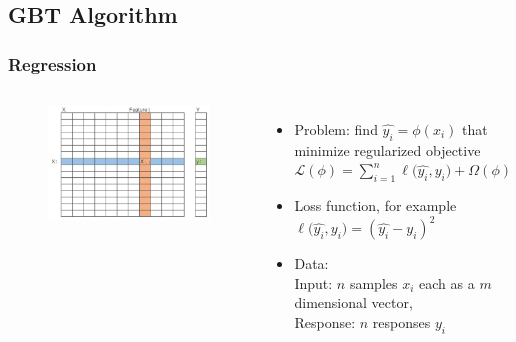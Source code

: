 \documentclass{beamer}
\begin{document}
\subsection{GBT Algorithm} 
\begin{frame}
	\frametitle{Regression}
	\begin{columns}[c] %
		
		\begin{figure}
			\includegraphics[width=1\linewidth]{figs/dataset.jpg}
		\end{figure}
		
		\begin{itemize}
			\item Problem: find $\widehat{y_i}=\phi(x_i)$ that minimize regularized objective
			$\mathcal{L(\phi)}= \sum_{i=1}^{n}{\ell{(\widehat{y_i},y_i}) + \Omega(\phi)}$

			\item Loss function, for example $\ell{(\widehat{y_i},y_i})=(\widehat{y_i}-y_i)^2$
			\item Data: \\
			Input: $n$ samples $x_i$ each as a $m$ dimensional vector, \\
			Response: $n$ responses $y_i$
		\end{itemize}
	\end{columns}	
\end{frame}
\end{document}
